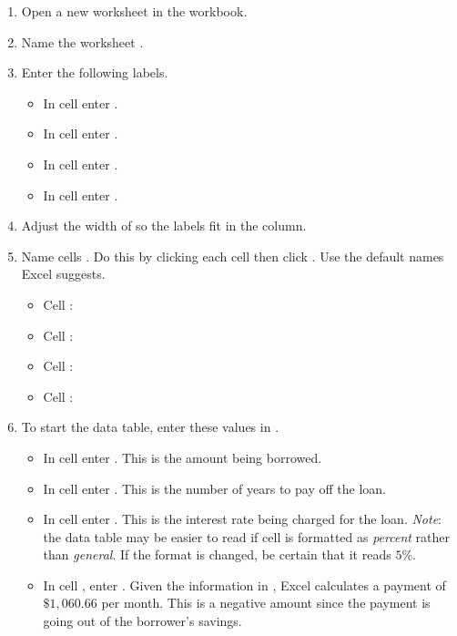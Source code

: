 \begin{enumbox}
	\begin{enumerate}
		\item Open a new worksheet in the  workbook.
		\item Name the worksheet .
		\item Enter the following labels.
		
		\begin{itemize}
			\item In cell  enter .
			\item In cell  enter .
			\item In cell  enter .
			\item In cell  enter .
		\end{itemize}
	
		\item Adjust the width of  so the labels fit in the column.
		\item Name cells . Do this by clicking each cell then click . Use the default names Excel suggests.
		
		\begin{itemize}
			\item Cell : 
			\item Cell : 
			\item Cell : 
			\item Cell : 
		\end{itemize}
		
		\item To start the data table, enter these values in .
		
		\begin{itemize}
			\item In cell  enter . This is the amount being borrowed.
			\item In cell  enter . This is the number of years to pay off the loan.
			\item In cell  enter . This is the interest rate being charged for the loan. \textit{Note}: the data table may be easier to read if cell  is formatted as \textit{percent} rather than \textit{general}. If the format is changed, be certain that it reads $ 5\% $.
			\item In cell , enter . Given the information in , Excel calculates a payment of $ \$1,060.66 $ per month. This is a negative amount since the payment is going out of the borrower's savings.
		\end{itemize}
	

\end{enumerate}
\end{enumbox}

